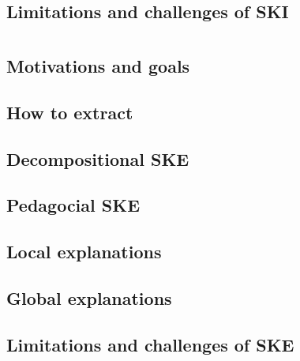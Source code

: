 \subsection[Limitations and challenges of SKI]{Limitations and challenges of \Gls{SKI}}\label{subsec:limitations-and-challenges-of-ski}

\section[Symbolic knowledge extraction]{}\label{sec:ske}

\subsection{Motivations and goals}\label{subsec:ske-motivations-and-goals}

\subsection{How to extract}\label{subsec:how-to-extract}

\subsection[Decompositional SKE]{Decompositional \Gls{SKE}}\label{subsec:decompositional-ske}

\subsection[Pedagocial SKE]{Pedagocial \Gls{SKE}}\label{subsec:pedagogical-ske}

\subsection{Local explanations}\label{subsec:local-explanations}

\subsection{Global explanations}\label{subsec:global-explanations}

\subsection[Limitations and challenges of SKE]{Limitations and challenges of \Gls{SKE}}\label{subsec:limitations-and-challenges-of-ske}
